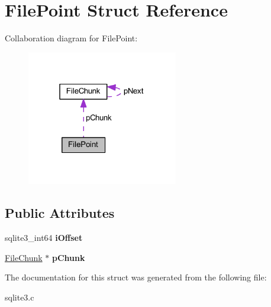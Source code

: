 \hypertarget{struct_file_point}{\section{File\-Point Struct Reference}
\label{struct_file_point}
}


Collaboration diagram for File\-Point\-:\nopagebreak
\begin{figure}[H]
\begin{center}
\leavevmode
\includegraphics[width=187pt]{struct_file_point__coll__graph}
\end{center}
\end{figure}
\subsection*{Public Attributes}
\begin{DoxyCompactItemize}
\item 
\hypertarget{struct_file_point_a00a345e479cd37ebeb9e6ed475eb4112}{sqlite3\-\_\-int64 {\bfseries i\-Offset}}\label{struct_file_point_a00a345e479cd37ebeb9e6ed475eb4112}

\item 
\hypertarget{struct_file_point_aa17216d9d2559f14a00a2c72a8959298}{\hyperlink{struct_file_chunk}{File\-Chunk} $\ast$ {\bfseries p\-Chunk}}\label{struct_file_point_aa17216d9d2559f14a00a2c72a8959298}

\end{DoxyCompactItemize}


The documentation for this struct was generated from the following file\-:\begin{DoxyCompactItemize}
\item 
sqlite3.\-c\end{DoxyCompactItemize}
